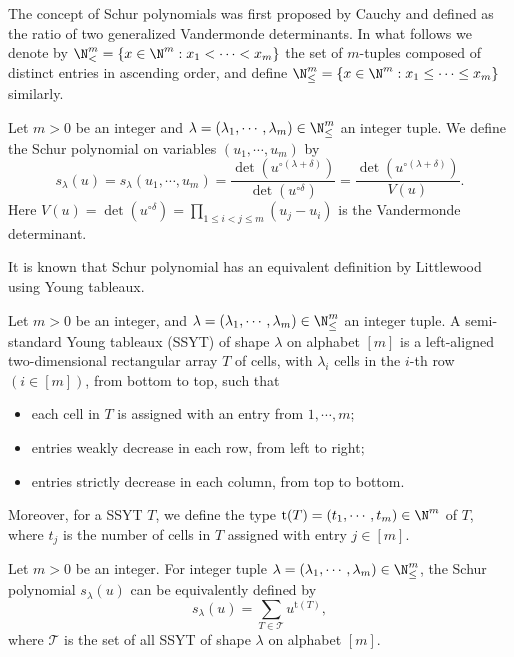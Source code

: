 The concept of Schur polynomials was first proposed by Cauchy and defined as the ratio of two generalized Vandermonde determinants. In what follows we denote by $\N^m_< = \{x \in \N^m: x_1 < \cdots < x_m\}$ the set of $m$-tuples composed of distinct entries in ascending order, and define $\N^m_{\le} = \{x \in \N^m: x_1 \le \cdots \le x_m\}$ similarly.
\begin{definition}
Let $m>0$ be an integer and $\lambda = (\lambda_1, \cdots, \lambda_m) \in \N^m_{\le}$ an integer tuple.
We define the Schur polynomial on variables $(u_1, \cdots, u_m)$ by
\[s_{\lambda}(u) = s_{\lambda}(u_1, \cdots, u_m)
=\frac{\det(u^{\circ (\lambda + \delta)})}{\det(u^{\circ \delta})}
=\frac{\det(u^{\circ (\lambda + \delta)})}{V(u)}.\]
Here $V(u) = \det(u^{\circ \delta}) = \prod_{1 \le i < j \le m}(u_j - u_i)$ is the Vandermonde determinant.
\end{definition}

It is known that Schur polynomial has an equivalent definition by Littlewood using Young tableaux.
\begin{definition}
Let $m > 0$ be an integer, and $\lambda = (\lambda_1, \cdots, \lambda_m) \in \N^m_{\le}$ an integer tuple.
A semi-standard Young tableaux (SSYT) of shape $\lambda$ on alphabet $[m]$
is a left-aligned two-dimensional rectangular array $T$ of cells,
with $\lambda_i$ cells in the $i$-th row $(i \in [m])$, from bottom to top, such that
\begin{itemize}
\item each cell in $T$ is assigned with an entry from $1, \cdots, m$;
\item entries weakly decrease in each row, from left to right;
\item entries strictly decrease in each column, from top to bottom.
\end{itemize}
Moreover, for a SSYT $T$, we define the type $\mathrm t(T) = (t_1, \cdots, t_m) \in \N^m$ of $T$,
where $t_j$ is the number of cells in $T$ assigned with entry $j \in [m]$.
\end{definition}
\begin{definition}
Let $m > 0$ be an integer.
For integer tuple $\lambda = (\lambda_1, \cdots, \lambda_m) \in \N_{\le}^m$,
the Schur polynomial $s_{\lambda}(u)$ can be equivalently defined by
\[s_{\lambda}(u) = \sum_{T \in \mathcal T} u^{\mathrm t(T)},\]
where $\mathcal T$ is the set of all SSYT of shape $\lambda$ on alphabet $[m]$.
\end{definition}






























